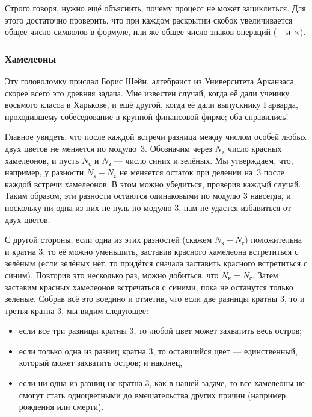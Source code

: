 \begin{addedbytheeditors}
Строго говоря, нужно ещё объяснить, почему процесс не может зациклиться.
Для этого достаточно проверить, что при каждом раскрытии скобок увеличивается общее число символов в формуле, или же общее число знаков операций ($+$ и $\times$).
\pr
\end{addedbytheeditors}

\subsubsection*{Хамелеоны}

Эту головоломку прислал Борис Шейн, алгебраист из Университета Арканзаса; скорее всего это древняя задача.
Мне известен случай, когда её дали ученику восьмого класса в Харькове,
и ещё другой, когда её дали выпускнику Гарварда, проходившему собеседование в крупной финансовой фирме; оба справились!

Главное увидеть, что после каждой встречи разница между числом особей любых двух цветов не меняется по модулю~3.
Обозначим через $N_{\text{к}}$ число красных хамелеонов, и пусть
$N_{\text{с}}$ и $N_{\text{з}}$ --- число синих и зелёных.
Мы утверждаем, что, например, у разности $N_{\text{к}} - N_{\text{с}}$ не меняется остаток при делении на~$3$ после каждой встречи хамелеонов.
В этом можно убедиться, проверив каждый случай.
Таким образом, эти разности остаются одинаковыми по модулю 3 навсегда, и поскольку ни одна из них не нуль по модулю 3, нам не удастся избавиться от двух цветов.

С другой стороны, если одна из этих разностей (скажем $N_{\text{к}} - N_{\text{с}}$) положительна и кратна $3$, то её можно уменьшить, заставив красного хамелеона встретиться с зелёным (если зелёных нет, то придётся сначала заставить красного встретиться с синим).
Повторив это несколько раз, можно добиться, что $N_{\text{к}} = N_{\text{с}}$.
Затем заставим красных хамелеонов встречаться с синими, пока не останутся только зелёные.
Собрав всё это воедино и отметив, что если две разницы кратны $3$, то и третья кратна $3$, мы видим следующее:
\begin{itemize}
\item если все три разницы кратны 3, то любой цвет может захватить весь остров;
\item если только одна из разниц кратна 3, то оставшийся цвет --- единственный, который может захватить остров; и наконец,
\item если ни одна из разниц не кратна 3, как в нашей задаче, то все хамелеоны не смогут стать одноцветными до вмешательства других причин (например, рождения или смерти).
\end{itemize}

